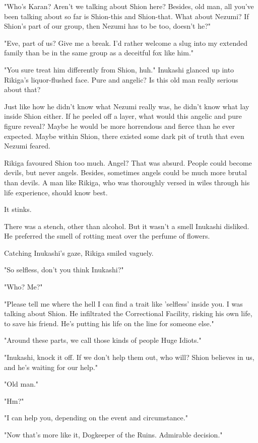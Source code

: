 "Who's Karan? Aren't we talking about Shion here? Besides, old man, all
you've been talking about so far is Shion-this and Shion-that. What
about Nezumi? If Shion's part of our group, then Nezumi has to be too,
doesn't he?"

"Eve, part of us? Give me a break. I'd rather welcome a slug into my
extended family than be in the same group as a deceitful fox like him."

"You sure treat him differently from Shion, huh." Inukashi glanced up
into Rikiga's liquor-flushed face. Pure and angelic? Is this old man
really serious about that?

Just like how he didn't know what Nezumi really was, he didn't know what
lay inside Shion either. If he peeled off a layer, what would this
angelic and pure figure reveal? Maybe he would be more horrendous and
fierce than he ever expected. Maybe within Shion, there existed some
dark pit of truth that even Nezumi feared.

Rikiga favoured Shion too much. Angel? That was absurd. People could
become devils, but never angels. Besides, sometimes angels could be much
more brutal than devils. A man like Rikiga, who was thoroughly versed in
wiles through his life experience, should know best.

It stinks.

There was a stench, other than alcohol. But it wasn't a smell Inukashi
disliked. He preferred the smell of rotting meat over the perfume of
flowers.

Catching Inukashi's gaze, Rikiga smiled vaguely.

"So selfless, don't you think Inukashi?"

"Who? Me?"

"Please tell me where the hell I can find a trait like 'selfless' inside
you. I was talking about Shion. He infiltrated the Correctional
Facility, risking his own life, to save his friend. He's putting his
life on the line for someone else."

"Around these parts, we call those kinds of people Huge Idiots."

"Inukashi, knock it off. If we don't help them out, who will? Shion
believes in us, and he's waiting for our help."

"Old man."

"Hm?"

"I can help you, depending on the event and circumstance."

"Now that's more like it, Dogkeeper of the Ruins. Admirable decision."

